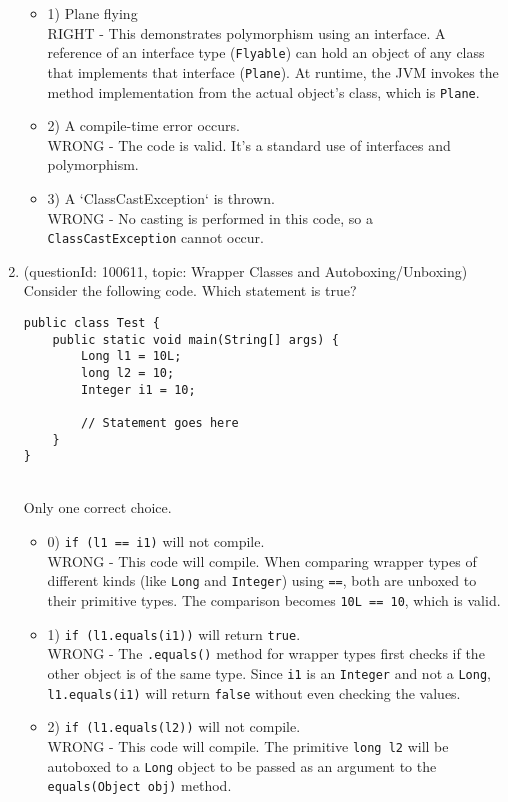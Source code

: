 \documentclass[12pt]{article}
\begin{document}
\begin{enumerate}[label=(\arabic*)]
\begin{itemize}
\item 1) Plane flying
 \\ 
RIGHT - This demonstrates polymorphism using an interface. A reference of an interface type (\verb|Flyable|) can hold an object of any class that implements that interface (\verb|Plane|). At runtime, the JVM invokes the method implementation from the actual object's class, which is \verb|Plane|.

\item 2) A compile-time error occurs.
 \\ 
WRONG - The code is valid. It's a standard use of interfaces and polymorphism.

\item 3) A `ClassCastException` is thrown.
 \\ 
WRONG - No casting is performed in this code, so a \verb|ClassCastException| cannot occur.

\end{itemize}
\item (questionId: 100611, topic: Wrapper Classes and Autoboxing/Unboxing) \\ 
Consider the following code. Which statement is true?\n\begin{verbatim}
public class Test {
    public static void main(String[] args) {
        Long l1 = 10L;
        long l2 = 10;
        Integer i1 = 10;

        // Statement goes here
    }
}
\end{verbatim}
\\ \noindent Only one correct choice. 
\begin{itemize}
\item 0) \verb|if (l1 == i1)| will not compile.
 \\ 
WRONG - This code will compile. When comparing wrapper types of different kinds (like \verb|Long| and \verb|Integer|) using \verb|==|, both are unboxed to their primitive types. The comparison becomes \verb|10L == 10|, which is valid.

\item 1) \verb|if (l1.equals(i1))| will return \verb|true|.
 \\ 
WRONG - The \verb|.equals()| method for wrapper types first checks if the other object is of the same type. Since \verb|i1| is an \verb|Integer| and not a \verb|Long|, \verb|l1.equals(i1)| will return \verb|false| without even checking the values.

\item 2) \verb|if (l1.equals(l2))| will not compile.
 \\ 
WRONG - This code will compile. The primitive \verb|long l2| will be autoboxed to a \verb|Long| object to be passed as an argument to the \verb|equals(Object obj)| method.


\end{itemize}
\end{enumerate}
\end{document}
